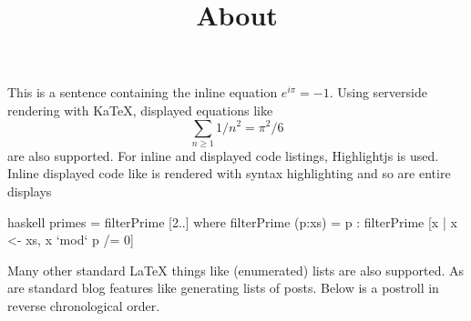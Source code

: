 \documentclass{page}
\title{About}
\begin{document}
This is a sentence containing the inline equation $e^{i\pi} = -1$. Using
serverside rendering with KaTeX, displayed equations like 
$$
    \sum_{n\ge 1} 1/n^2 = \pi^2/6
$$
are also supported. For inline and displayed code listings, Highlightjs is used.
Inline displayed code like  is rendered with
syntax highlighting and so are entire displays
\begin{code}{haskell}
primes = filterPrime [2..] where
  filterPrime (p:xs) = p : filterPrime [x | x <- xs, x `mod` p /= 0]
\end{code}
Many other standard LaTeX things like (enumerated) lists are also supported. As
are standard blog features like generating lists of posts. Below is a postroll
in reverse chronological order.

\postroll
\end{document}
